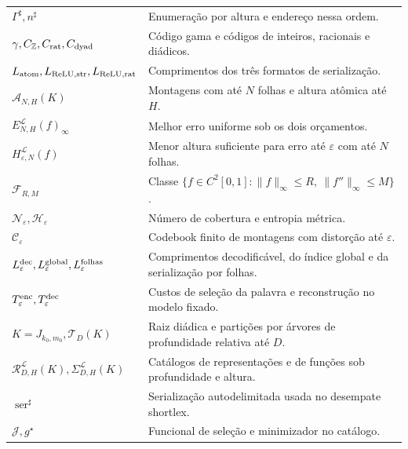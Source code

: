 \documentclass[11pt,a4paper]{article}
\theoremstyle{preciso}
\theoremstyle{definition}
\newcommand{\Z}{\mathbb Z}
\newcommand{\LL}{\mathcal L}
\newcommand{\Asm}{\mathcal A}
\newcommand{\FF}{\mathcal F}
\newcommand{\RR}{\mathcal R}
\newcommand{\CC}{\mathcal C}
\newcommand{\ser}{\operatorname{ser}}
\begin{document}
\begin{longtable}{@{}p{.28\linewidth}p{.68\linewidth}@{}}
$\Gamma^\sharp,n^\sharp$&Enumeração por altura e endereço nessa ordem.\\
$\gamma,C_{\Z},C_{\rm rat},C_{\rm dyad}$&Código gama e códigos de inteiros, racionais e diádicos.\\
$L_{\rm atom},L_{\rm ReLU,str},L_{\rm ReLU,rat}$&Comprimentos dos três formatos de serialização.\\
$\Asm_{N,H}(K)$&Montagens com até $N$ folhas e altura atômica até $H$.\\
$E^{\LL}_{N,H}(f)_\infty$&Melhor erro uniforme sob os dois orçamentos.\\
$H^{\LL}_{\varepsilon,N}(f)$&Menor altura suficiente para erro até $\varepsilon$ com até $N$ folhas.\\
$\FF_{R,M}$&Classe $\{f\in C^2[0,1]:\|f\|_\infty\le R,\ \|f''\|_\infty\le M\}$.\\
$\mathcal N_\varepsilon,\mathcal H_\varepsilon$&Número de cobertura e entropia métrica.\\
$\CC_\varepsilon$&Codebook finito de montagens com distorção até $\varepsilon$.\\
$L_\varepsilon^{\rm dec},L_\varepsilon^{\rm global},L_\varepsilon^{\rm folhas}$&Comprimentos decodificável, do índice global e da serialização por folhas.\\
$T_\varepsilon^{\rm enc},T_\varepsilon^{\rm dec}$&Custos de seleção da palavra e reconstrução no modelo fixado.\\
$K=J_{k_0,m_0},\mathcal T_D(K)$&Raiz diádica e partições por árvores de profundidade relativa até $D$.\\
$\RR^{\LL}_{D,H}(K),\Sigma^{\LL}_{D,H}(K)$&Catálogos de representações e de funções sob profundidade e altura.\\
$\ser^\sharp$&Serialização autodelimitada usada no desempate shortlex.\\
$\mathcal J,g^\star$&Funcional de seleção e minimizador no catálogo.\\
\end{longtable}
\normalsize

\end{document}
